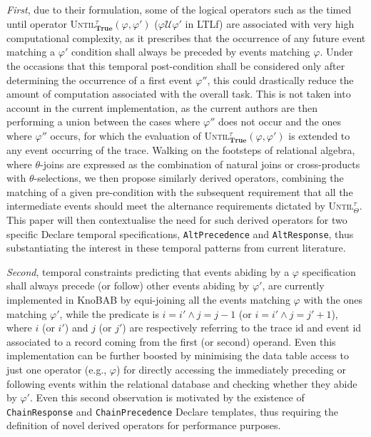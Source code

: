 \documentclass[sigconf]{acmart}
\begin{document}
\textit{First}, due to their formulation, some of the logical operators such as the timed until operator \textsc{Until}$^\tau_\textbf{True}(\varphi,\varphi')$ ($\varphi \mathcal{U}\varphi'$ in LTL\textsf{f}) are associated with very high computational complexity, as it prescribes that the occurrence of any future event matching a $\varphi'$ condition shall always be preceded by events matching $\varphi$. Under the occasions that this temporal post-condition shall be considered only after determining the occurrence of a first event  $\varphi''$, this could drastically reduce the amount of computation associated with the overall task. This is not taken into account in the current implementation, as the current authors are then performing a union between the cases where $\varphi''$ does not occur and the ones where $\varphi''$ occurs, for which the evaluation of \textsc{Until}$^\tau_\textbf{True}(\varphi,\varphi')$ is extended to any event occurring of the trace. Walking on the footsteps of relational algebra, where $\theta$-joins are expressed as the combination of natural joins \cite{DBLP:books/mg/AtzeniCPT99} or cross-products \cite{10.5555/2842853} with $\theta$-selections, we then propose similarly derived operators, combining the matching of a given pre-condition with the subsequent requirement that all the intermediate events should meet the alternance requirements dictated by \textsc{Until}$^\tau_\Theta$. This paper will then contextualise the need for such derived operators for two specific Declare temporal specifications, \texttt{AltPrecedence} and \texttt{AltResponse}, thus substantiating the interest in these temporal patterns from current literature.

\textit{Second}, temporal constraints predicting that events abiding by a $\varphi$ specification shall always precede (or follow) other events abiding by $\varphi'$, are currently implemented in KnoBAB by equi-joining all the events matching  $\varphi$ with the ones matching $\varphi'$, while the predicate is $i=i' \wedge j=j-1$ (or $i=i' \wedge j=j'+1$), where $i$ (or $i'$) and $j$ (or $j'$) are respectively referring to the trace id and event id associated to a record coming from the first (or second) operand. Even this implementation can be further boosted by minimising the data table access to just one operator (e.g., $\varphi$) for directly accessing the immediately preceding or following events within the relational database and checking whether they abide by $\varphi'$. Even this second observation is motivated by the existence of \texttt{ChainResponse} and \texttt{ChainPrecedence} Declare templates, thus requiring the definition of novel derived operators for performance purposes.
\end{document}
